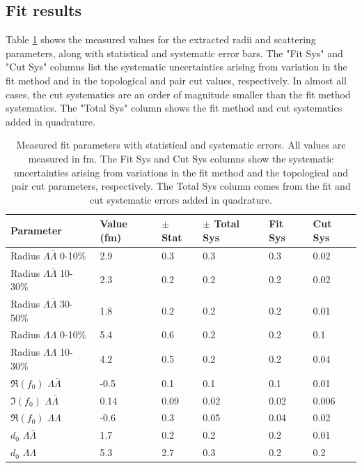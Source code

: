 \subsection{Fit results}
\label{sec:FitResults}

Table \ref{tab:FitParams} shows the measured values for the extracted radii and scattering parameters, along with statistical and systematic error bars.
The "Fit Sys" and "Cut Sys" columns list the systematic uncertainties arising from variation in the fit method and in the topological and pair cut values, respectively.
In almost all cases, the cut systematics are an order of magnitude smaller than the fit method systematics.
The "Total Sys" column shows the fit method and cut systematics added in quadrature.


\begin{table}
\begin{center}

\begin{tabular}{|l|l|l|l|l|l|}
\hline 
Parameter & Value (fm) & $\pm$ Stat & $\pm$ Total Sys & Fit Sys & Cut Sys \\ 
\hline 
Radius $\Lambda\bar{\Lambda}$ 0-10\% & 2.9 & 0.3 & 0.3 & 0.3 & 0.02 \\ 
\hline 
Radius $\Lambda\bar{\Lambda}$ 10-30\%  & 2.3 & 0.2 & 0.2 & 0.2 & 0.02 \\ 
\hline 
Radius $\Lambda\bar{\Lambda}$ 30-50\%  & 1.8 & 0.2 & 0.2 & 0.2 & 0.01 \\ 
\hline 
Radius $\Lambda\Lambda$ 0-10\% & 5.4 & 0.6 & 0.2 & 0.2 & 0.1 \\ 
\hline 
Radius $\Lambda\Lambda$ 10-30\% & 4.2 & 0.5 & 0.2 & 0.2 & 0.04 \\ 
\hline 
$\Re(f_0)$ $\Lambda\bar{\Lambda}$ & -0.5 & 0.1 & 0.1 & 0.1 & 0.01 \\ 
\hline 
$\Im(f_0)$ $\Lambda\bar{\Lambda}$ & 0.14 & 0.09 & 0.02 & 0.02 & 0.006 \\ 
\hline 
$\Re(f_0)$ $\Lambda\Lambda$ & -0.6 & 0.3 & 0.05 & 0.04 & 0.02 \\ 
\hline 
$d_0$ $\Lambda\bar{\Lambda}$ & 1.7 & 0.2 & 0.2 & 0.2 & 0.01 \\ 
\hline 
$d_0$ $\Lambda\Lambda$ & 5.3 & 2.7 & 0.3 & 0.2 & 0.2 \\ 
\hline 
\end{tabular} 
\end{center}
\caption[Fit results]{Measured fit parameters with statistical and systematic errors.
All values are measured in fm.
The Fit Sys and Cut Sys columns show the systematic uncertainties arising from variations in the fit method and the topological and pair cut parameters, respectively.
The Total Sys column comes from the fit and cut systematic errors added in quadrature. }
\label{tab:FitParams}
\end{table}






